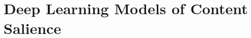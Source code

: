 
\section{Deep Learning Models of Content Salience}
\label{sec:chapter4}
\label{sec:deep_learning_salience}





